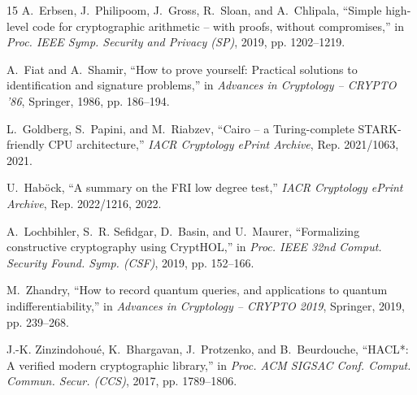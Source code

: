 \documentclass[conference]{IEEEtran}
\theoremstyle{definition}
\begin{document}
\begin{thebibliography}{15}
A.~Erbsen, J.~Philipoom, J.~Gross, R.~Sloan, and A.~Chlipala, ``Simple high-level code for cryptographic arithmetic -- with proofs, without compromises,'' in \emph{Proc. IEEE Symp. Security and Privacy (SP)}, 2019, pp. 1202--1219.

A.~Fiat and A.~Shamir, ``How to prove yourself: Practical solutions to identification and signature problems,'' in \emph{Advances in Cryptology -- CRYPTO '86}, Springer, 1986, pp. 186--194.

L.~Goldberg, S.~Papini, and M.~Riabzev, ``Cairo -- a {Turing}-complete {STARK}-friendly {CPU} architecture,'' \emph{IACR Cryptology ePrint Archive}, Rep. 2021/1063, 2021.

U.~Hab{\"o}ck, ``A summary on the {FRI} low degree test,'' \emph{IACR Cryptology ePrint Archive}, Rep. 2022/1216, 2022.

A.~Lochbihler, S.~R. Sefidgar, D.~Basin, and U.~Maurer, ``Formalizing constructive cryptography using {CryptHOL},'' in \emph{Proc. IEEE 32nd Comput. Security Found. Symp. (CSF)}, 2019, pp. 152--166.

M.~Zhandry, ``How to record quantum queries, and applications to quantum indifferentiability,'' in \emph{Advances in Cryptology -- CRYPTO 2019}, Springer, 2019, pp. 239--268.

J.-K. Zinzindohou{\'e}, K.~Bhargavan, J.~Protzenko, and B.~Beurdouche, ``{HACL*}: A verified modern cryptographic library,'' in \emph{Proc. ACM SIGSAC Conf. Comput. Commun. Secur. (CCS)}, 2017, pp. 1789--1806.

\end{thebibliography}
\end{document}
